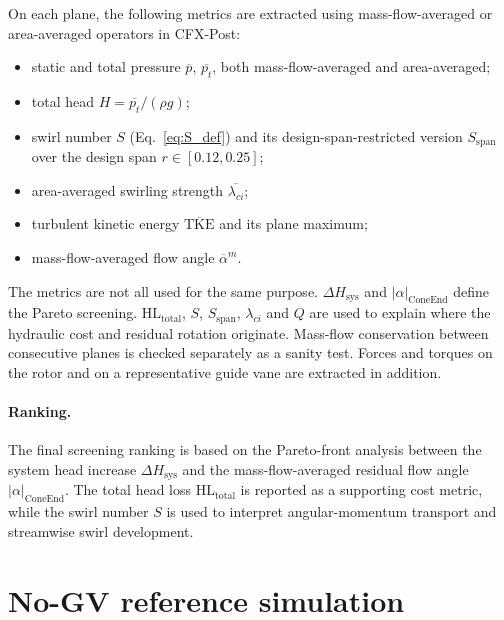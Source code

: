 On each plane, the following metrics are extracted using mass-flow-averaged or area-averaged operators in CFX-Post:
\begin{itemize}
  \item static and total pressure $\overline{p}$, $\overline{p_t}$, both mass-flow-averaged and area-averaged;
  \item total head $H = \overline{p_t}/(\rho g)$;
  \item swirl number $S$ (Eq.~\ref{eq:S_def}) and its design-span-restricted version $S_{\mathrm{span}}$ over the design span $r \in [0.12, 0.25]$;
  \item area-averaged swirling strength $\overline{\lambda_{ci}}$;
  \item turbulent kinetic energy $\overline{\mathrm{TKE}}$ and its plane maximum;
  \item mass-flow-averaged flow angle $\overline{\alpha}^{m}$.
\end{itemize}

The metrics are not all used for the same purpose. \(\Delta H_{\mathrm{sys}}\) and \(|\alpha|_{\mathrm{ConeEnd}}\) define the Pareto screening. \(\mathrm{HL_{total}}\), \(S\), \(S_{\mathrm{span}}\), \(\lambda_{ci}\) and \(Q\) are used to explain where the hydraulic cost and residual rotation originate.
Mass-flow conservation between consecutive planes is checked separately as a sanity test. Forces and torques on the rotor and on a representative guide vane are extracted in addition.
 
\paragraph{Ranking.}
The final screening ranking is based on the Pareto-front analysis between the system head increase \(\Delta H_{\mathrm{sys}}\) and the mass-flow-averaged residual flow angle \(|\alpha|_{\mathrm{ConeEnd}}\). The total head loss \(\mathrm{HL_{total}}\) is reported as a supporting cost metric, while the swirl number \(S\) is used to interpret angular-momentum transport and streamwise swirl development.
 
\section{No-GV reference simulation}
\label{sec:methods_rdt_baseline}
 
